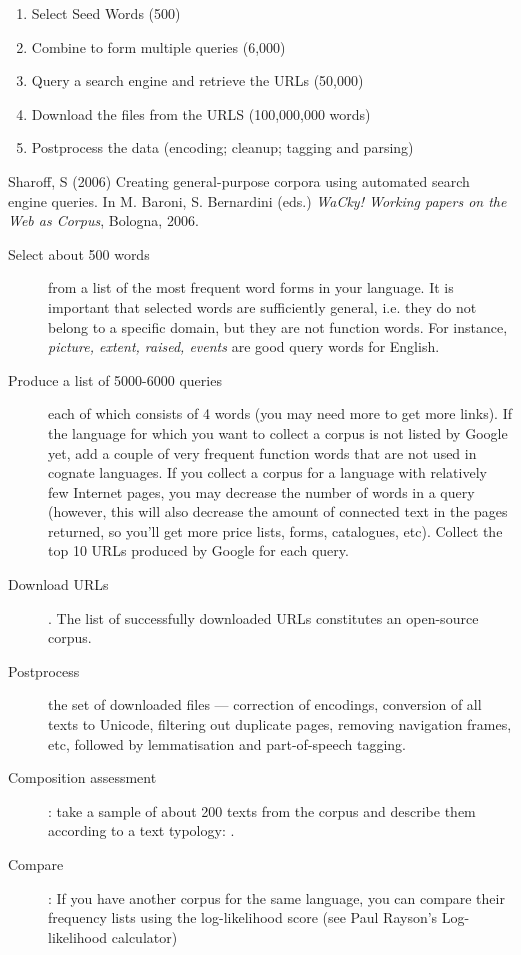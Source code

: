 \documentclass[a4paper,landscape,headrule,footrule,xetex]{foils}
\begin{document}

\begin{enumerate}
\item Select Seed Words (500)
\item Combine to form multiple queries (6,000)
\item Query a search engine and retrieve the URLs (50,000)
\item Download the files from the URLS (100,000,000 words)
\item Postprocess the data (encoding; cleanup; tagging and parsing)
\end{enumerate}

Sharoff, S (2006) Creating general-purpose corpora using automated search engine queries. In M. Baroni, S. Bernardini (eds.) \textit{WaCky! Working papers on the Web as Corpus}, Bologna, 2006.

 
 \begin{description}
 \item [Select about 500 words] from a list of the most frequent word
   forms in your language. It is important that selected words are
   sufficiently general, i.e. they do not belong to a specific domain,
   but they are not function words. For instance, \textit{picture,
     extent, raised, events} are good query words for English.
 \item [Produce a list of 5000-6000 queries] each of which consists of
   4 words (you may need more to get more links). If the language for
   which you want to collect a corpus is not listed by Google yet, add
   a couple of very frequent function words that are not used in
   cognate languages. If you collect a corpus for a language with
   relatively few Internet pages, you may decrease the number of words
   in a query (however, this will also decrease the amount of
   connected text in the pages returned, so you'll get more price
   lists, forms, catalogues, etc). Collect the top 10 URLs produced by
   Google for each query.

 \item [Download URLs]. The list of successfully
   downloaded URLs constitutes an open-source corpus.  

 \item [Postprocess] the set of downloaded files --- correction of
   encodings, conversion of all texts to Unicode, filtering out
   duplicate pages, removing navigation frames, etc, followed by
   lemmatisation and part-of-speech tagging.
 \item [Composition assessment]: take a sample of about 200 texts from
   the corpus and describe them according to a text typology:
.
 \item [Compare]: If you have another corpus for the same
   language, you can compare their frequency lists using the
   log-likelihood score (see Paul Rayson's Log-likelihood calculator)
 \end{description}
\end{document}
